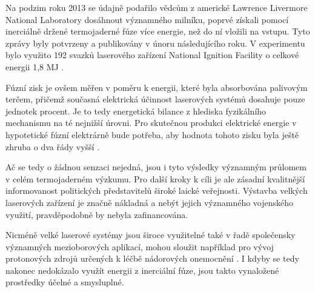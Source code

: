Na podzim roku 2013 se údajně podařilo vědcům z americké Lawrence Livermore National Laboratory dosáhnout významného milníku, poprvé získali pomocí inerciálně držené termojaderné fúze více energie, než do ní vložili na vstupu. Tyto zprávy byly potvrzeny a publikovány v únoru následujícího roku. V experimentu bylo využito 192 svazků laserového zařízení National Ignition Facility o celkové energii 1{,}8 MJ \cite{hurricane}. 

Fúzní zisk je ovšem měřen v poměru k energii, které byla absorbována palivovým terčem, přičemž současná elektrická účinnost laserových systémů dosahuje pouze jednotek procent. Je to tedy energetická bilance z hlediska fyzikálního mechanismu na té nejnižší úrovni. Pro skutečnou produkci elektrické energie v hypotetické fúzní elektrárně bude potřeba, aby hodnota tohoto zisku byla ještě zhruba o dva řády vyšší \cite{nif}.

Ač se tedy o žádnou senzaci nejedná, jsou i tyto výsledky významným průlomem v celém termojaderném výzkumu. Pro další kroky k cíli je ale zásadní kvalitnější informovanost politických představitelů široké laické veřejnosti. Výstavba velkých laserových zařízení je značně nákladná a nebýt jejich významného vojenského využití, pravděpodobně by nebyla zafinancována.

Nicméně velké laserové systémy jsou široce využitelné také v řadě společensky významných mezioborových aplikací, mohou sloužit například pro vývoj protonových zdrojů určených k léčbě nádorových onemocnění \cite{bin}. I kdyby se tedy nakonec nedokázalo využít energii z inerciální fúze, jsou takto vynaložené prostředky účelné a smysluplné.